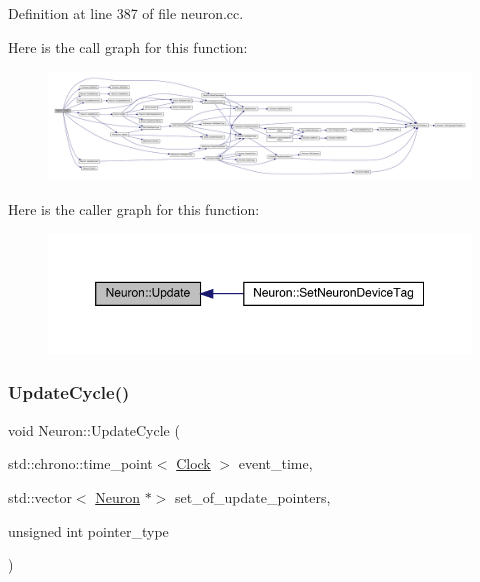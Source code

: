 Definition at line 387 of file neuron.\+cc.

Here is the call graph for this function\+:
\nopagebreak
\begin{figure}[H]
\begin{center}
\leavevmode
\includegraphics[width=350pt]{class_neuron_a4d1dc3a9f30196fe2b09dfbfc0a567bb_cgraph}
\end{center}
\end{figure}
Here is the caller graph for this function\+:
\nopagebreak
\begin{figure}[H]
\begin{center}
\leavevmode
\includegraphics[width=350pt]{class_neuron_a4d1dc3a9f30196fe2b09dfbfc0a567bb_icgraph}
\end{center}
\end{figure}
\mbox{\label{class_neuron_a06f45a5d1de890da84d3644fe58ea0a9}} 
\subsubsection{\texorpdfstring{Update\+Cycle()}{UpdateCycle()}}
{\footnotesize\ttfamily void Neuron\+::\+Update\+Cycle (\begin{DoxyParamCaption}\item[{std\+::chrono\+::time\+\_\+point$<$ \hyperlink{universe_8h_a0ef8d951d1ca5ab3cfaf7ab4c7a6fd80}{Clock} $>$}]{event\+\_\+time,  }\item[{std\+::vector$<$ \hyperlink{class_neuron}{Neuron} $\ast$$>$}]{set\+\_\+of\+\_\+update\+\_\+pointers,  }\item[{unsigned int}]{pointer\+\_\+type }\end{DoxyParamCaption})}




